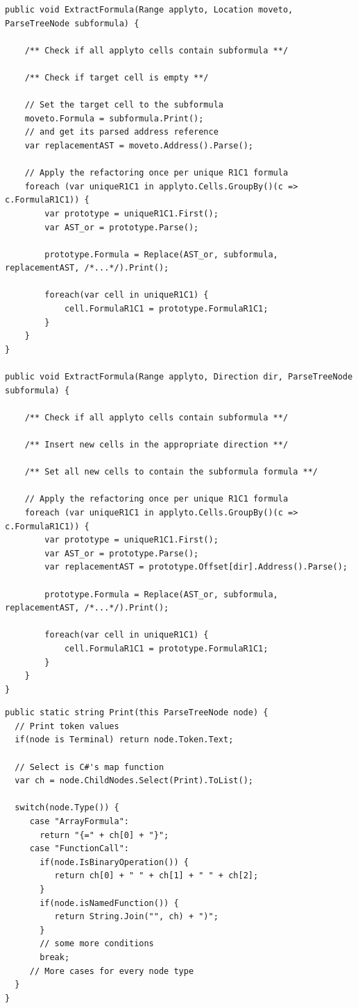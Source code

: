 \documentclass[12pt,a4paper,onecolumn,oneside,parskip]{memoir}
\begin{document}
\lstset{style=sharpc}
\begin{lstlisting}[float,caption={Extract formula refactoring (simplified)}, label={lst:extractformula}]
public void ExtractFormula(Range applyto, Location moveto, ParseTreeNode subformula) {
	
	/** Check if all applyto cells contain subformula **/
	
	/** Check if target cell is empty **/
	
	// Set the target cell to the subformula
	moveto.Formula = subformula.Print();
	// and get its parsed address reference
	var replacementAST = moveto.Address().Parse();
	
	// Apply the refactoring once per unique R1C1 formula
	foreach (var uniqueR1C1 in applyto.Cells.GroupBy()(c => c.FormulaR1C1)) {
		var prototype = uniqueR1C1.First();
		var AST_or = prototype.Parse();
		
		prototype.Formula = Replace(AST_or, subformula, replacementAST, /*...*/).Print();
		
		foreach(var cell in uniqueR1C1) {
			cell.FormulaR1C1 = prototype.FormulaR1C1;
		}
	}
}

public void ExtractFormula(Range applyto, Direction dir, ParseTreeNode subformula) {
	
	/** Check if all applyto cells contain subformula **/
	
	/** Insert new cells in the appropriate direction **/
	
	/** Set all new cells to contain the subformula formula **/
	
	// Apply the refactoring once per unique R1C1 formula
	foreach (var uniqueR1C1 in applyto.Cells.GroupBy()(c => c.FormulaR1C1)) {
		var prototype = uniqueR1C1.First();
		var AST_or = prototype.Parse();
		var replacementAST = prototype.Offset[dir].Address().Parse();
		
		prototype.Formula = Replace(AST_or, subformula, replacementAST, /*...*/).Print();

		foreach(var cell in uniqueR1C1) {
			cell.FormulaR1C1 = prototype.FormulaR1C1;
		}
	}
}
\end{lstlisting}

\lstset{style=sharpc}
\begin{lstlisting}[float,caption={XLParser Print method (simplified)}, label={lst:xlparserprint}]
public static string Print(this ParseTreeNode node) {
  // Print token values
  if(node is Terminal) return node.Token.Text;
  
  // Select is C#'s map function
  var ch = node.ChildNodes.Select(Print).ToList();
  
  switch(node.Type()) {
     case "ArrayFormula":
       return "{=" + ch[0] + "}";
     case "FunctionCall":
       if(node.IsBinaryOperation()) {
          return ch[0] + " " + ch[1] + " " + ch[2];
       }
       if(node.isNamedFunction()) {
          return String.Join("", ch) + ")";
       }
       // some more conditions
       break;
     // More cases for every node type
  }
}
\end{lstlisting}
\end{document}
